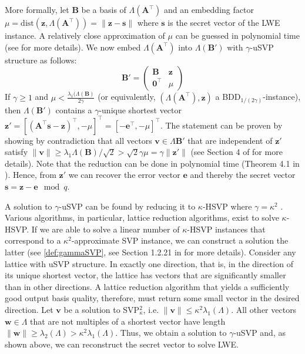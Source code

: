 More formally, let $\mathbf{B}$ be a basis of $\Lambda(\mathbf{A}^\intercal)$ %
and an embedding factor $\mu = \text{dist}(\mathbf{z}, \Lambda(\mathbf{A}^\intercal)) = \| \mathbf{z} - \mathbf{s}\|$ where $\mathbf{s}$ is the secret vector of the LWE instance. A relatively close approximation of $\mu$ can be guessed in polynomial time (see \cite{LM09} for more details). We now embed $\Lambda(\mathbf{A}^\intercal)$ into $\Lambda(\mathbf{B}')$ with $\gamma$-uSVP structure as follows: %
\begin{equation}
  \mathbf{B}' = \begin{pmatrix}
    \mathbf{B}           & \mathbf{z} \\
    \mathbf{0}^\intercal & \mu
  \end{pmatrix}
\end{equation}
If $\gamma \geq 1$ and $\mu < \frac{\lambda_1(\Lambda(\mathbf{B})}{2\gamma}$ (or equivalently, $(\Lambda(\mathbf{A}^\intercal), \mathbf{z})$ a BDD$_{1/(2\gamma)}$-instance), then $\Lambda(\mathbf{B}')$ contains a $\gamma$-unique shortest vector $\mathbf{z}' = \left[(\mathbf{A}^\intercal\mathbf{s} - \mathbf{z})^\intercal, -\mu\right]^\intercal = \left[-\mathbf{e}^\intercal, -\mu\right]^\intercal$.
The statement can be proven by showing by contradiction that all vectors $\mathbf{v} \in \Lambda{\mathbf{B}'}$ that are independent of $\mathbf{z}'$ satisfy $\| \mathbf{v}\| \geq \lambda_1{\Lambda(\mathbf{B})}/\sqrt{2} > \sqrt{2}\gamma \mu = \gamma \|\mathbf{z}'\|$ (see Section 4 of \cite{LM09} for more details). Note that the reduction can be done in polynomial time (Theorem 4.1 in \cite{LM09}).%
Hence, from $\mathbf{z}'$ we can recover the error vector $\mathbf{e}$ and thereby the secret vector $\mathbf{s} = \mathbf{z} - \mathbf{e} \mod q$.

A solution to $\gamma$-uSVP can be found by reducing it to $\kappa$-HSVP where $\gamma = \kappa^2$ \cite{APS15}. Various algorithms, in particular, lattice reduction algorithms, exist to solve $\kappa$-HSVP. If we are able to solve a linear number of $\kappa$-HSVP instances that correspond to a $\kappa^2$-approximate SVP instance, we can construct a solution the latter (see \cref{def:gammaSVP}, see Section 1.2.21 in \cite{Lov87} for more details).
Consider any lattice with uSVP structure. In exactly one direction, that is, in the direction of its unique shortest vector, the lattice has vectors that are significantly smaller than in other directions. A lattice reduction algorithm that yields a sufficiently good output basis quality, therefore, must return some small vector in the desired direction.
Let $\mathbf{v}$ be a solution to SVP$_\kappa^2$, i.e. $\|\mathbf{v}\| \leq \kappa^2 \lambda_1(\Lambda)$. All other vectors $\mathbf{w}\in \Lambda$ that are not multiples of a shortest vector have length $\|\mathbf{w}\| \geq \lambda_2(\Lambda) > \kappa^2\lambda_1(\Lambda)$. Thus, we obtain a solution to $\gamma$-uSVP and, as shown above, we can reconstruct the secret vector to solve LWE.

